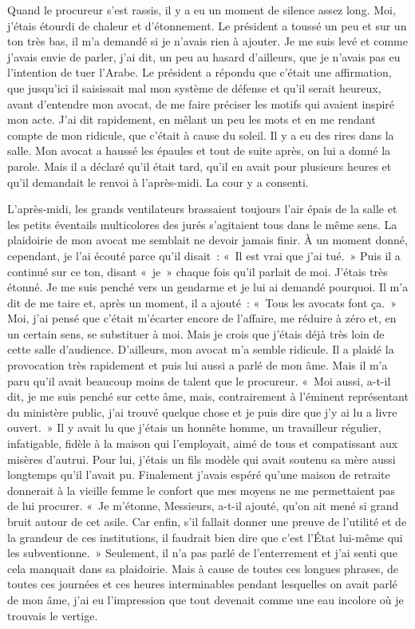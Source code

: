 \documentclass[french,twoside]{book} %
\begin{document}
Quand le procureur s’est rassis, il y a eu un moment de silence assez long. Moi, j’étais étourdi de chaleur et d’étonnement. Le président a toussé un peu et sur un ton très bas, il m’a demandé si je n’avais rien à ajouter. Je me suis levé et comme j’avais envie de parler, j’ai dit, un peu au hasard d’ailleurs, que je n’avais pas eu l’intention de tuer l’Arabe. Le président a répondu que c’était une affirmation, que jusqu’ici il saisissait mal mon système de défense et qu’il serait heureux, avant d’entendre mon avocat, de me faire préciser les motifs qui avaient inspiré mon acte. J'ai dit rapidement, en mêlant un peu les mots et en me rendant compte de mon ridicule, que c’était à cause du soleil. Il y a eu des rires dans la salle. Mon avocat a haussé les épaules et tout de suite après, on lui a donné la parole. Mais il a déclaré qu’il était tard, qu’il en avait pour plusieurs heures et qu’il demandait le renvoi à l’après-midi. La cour y a consenti.\par
L'après-midi, les grands ventilateurs brassaient toujours l’air épais de la salle et les petits éventails multicolores des jurés s’agitaient tous dans le même sens. La plaidoirie de mon avocat me semblait ne devoir jamais finir. À un moment donné, cependant, je l’ai écouté parce qu’il disait : « Il est vrai que j’ai tué. » Puis il a continué sur ce ton, disant « je » chaque fois qu’il parlait de moi. J'étais très étonné. Je me suis penché vers un gendarme et je lui ai demandé pourquoi. Il m’a dit de me taire et, après un moment, il a ajouté : « Tous les avocats font ça. » Moi, j’ai pensé que c’était m’écarter encore de l’affaire, me réduire à zéro et, en un certain sens, se substituer à moi. Mais je crois que j’étais déjà très loin de cette salle d’audience. D'ailleurs, mon avocat m’a semble ridicule. Il a plaidé la provocation très rapidement et puis lui aussi a parlé de mon âme. Mais il m’a paru qu’il avait beaucoup moins de talent que le procureur. « Moi aussi, a-t-il dit, je me suis penché sur cette âme, mais, contrairement à l’éminent représentant du ministère public, j’ai trouvé quelque chose et je puis dire que j’y ai lu a livre ouvert. » Il y avait lu que j’étais un honnête homme, un travailleur régulier, infatigable, fidèle à la maison qui l’employait, aimé de tous et compatissant aux misères d’autrui. Pour lui, j’étais un fils modèle qui avait soutenu sa mère aussi longtemps qu’il l’avait pu. Finalement j’avais espéré qu’une maison de retraite donnerait à la vieille femme le confort que mes moyens ne me permettaient pas de lui procurer. « Je m’étonne, Messieurs, a-t-il ajouté, qu’on ait mené si grand bruit autour de cet asile. Car enfin, s’il fallait donner une preuve de l’utilité et de la grandeur de ces institutions, il faudrait bien dire que c’est l’État lui-même qui les subventionne. » Seulement, il n’a pas parlé de l’enterrement et j’ai senti que cela manquait dans sa plaidoirie. Mais à cause de toutes ces longues phrases, de toutes ces journées et ces heures interminables pendant lesquelles on avait parlé de mon âme, j’ai eu l’impression que tout devenait comme une eau incolore où je trouvais le vertige.\par
\end{document}
